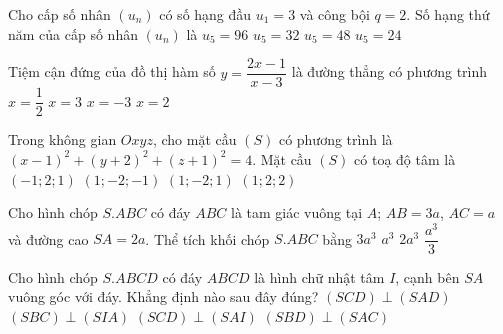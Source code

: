 \begin{ex}%
Cho cấp số nhân $\left(u_n\right)$ có số hạng đầu $u_1=3$ và công bội $q=2$. Số hạng thứ năm của cấp số nhân $\left(u_n\right)$ là
\choice
{$u_5=96$}
{$u_5=32$}
{\True $u_5=48$}
{$u_5=24$}
\end{ex}
\begin{ex}%
Tiệm cận đứng của đồ thị hàm số $y=\dfrac{2x-1}{x-3}$ là đường thẳng có phương trình
\choice
{$x=\dfrac{1}{2}$}
{\True $x=3$}
{$x=-3$}
{$x=2$}
\end{ex}
\begin{ex}%
Trong không gian $Oxyz$, cho mặt cầu $(S)$ có phương trình là $\left(x-1\right)^2+\left(y+2\right)^2+\left(z+1\right)^2=4$. Mặt cầu $(S)$ có toạ độ tâm là
\choice
{$\left(-1;2;1\right)$}
{\True $\left(1;-2;-1\right)$}
{$\left(1;-2;1\right)$}
{$\left(1;2;2\right)$}
\end{ex}
\begin{ex}%
Cho hình chóp $S.ABC$ có đáy $ABC$ là tam giác vuông tại $A$; $AB=3a$, $AC=a$ và đường cao $SA=2a$. Thể tích khối chóp $S.ABC$ bằng
\choice
{$3a^3$}
{\True $a^3$}
{$2a^3$}
{$\dfrac{a^3}{3}$}
\end{ex}
\begin{ex}%
Cho hình chóp $S.ABCD$ có đáy $ABCD$ là hình chữ nhật tâm $I$, cạnh bên $SA$ vuông góc với đáy. Khẳng định nào sau đây đúng?
\choice
{\True $(SCD)\perp(SAD)$}
{$(SBC)\perp(SIA)$}
{$(SCD)\perp(SAI)$}
{$(SBD)\perp(SAC)$}
\end{ex}
